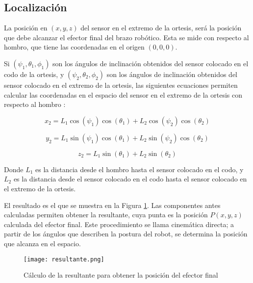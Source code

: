 \subsection{Localización}

La posición en $(x, y, z)$ del sensor en el extremo de la ortesis, será la posición que debe alcanzar el efector final del brazo robótico. Esta se mide con respecto al hombro, que tiene las coordenadas en el origen $(0, 0 ,0)$.

Si $(\psi_{1}, \theta_{1}, \phi_{1})$ son los ángulos de inclinación obtenidos del sensor colocado en el codo de la ortesis, y $(\psi_{2}, \theta_{2}, \phi_{2})$ son los ángulos de inclinación obtenidos del sensor colocado en el extremo de la ortesis, las siguientes ecuaciones permiten calcular las coordenadas en el espacio del sensor en el extremo de la ortesis con respecto al hombro \cite{mathworks2025}:

\begin{equation}
x_2 = L_1 \cos(\psi_1) \cos(\theta_1) + L_2 \cos(\psi_2) \cos(\theta_2)
\end{equation}

\begin{equation}
y_2 = L_1 \sin(\psi_1) \cos(\theta_1) + L_2 \sin(\psi_2) \cos(\theta_2)
\end{equation}

\begin{equation}
z_2 = L_1 \sin(\theta_1) + L_2 \sin(\theta_2)
\end{equation}

Donde $L_1$ es la distancia desde el hombro hasta el sensor colocado en el codo, y $L_2$ es la distancia desde el sensor colocado en el codo hasta el sensor colocado en el extremo de la ortesis.

El resultado es el que se muestra en la Figura \ref{fig:resultante}. Las componentes antes calculadas permiten obtener la resultante, cuya punta es la posición $P(x,y,z)$ calculada del efector final. Este procedimiento se llama cinemática directa; a partir de los ángulos que describen la postura del robot, se determina la posición que alcanza en el espacio.

\begin{figure}[htb]
	\centering
	\texttt{[image: resultante.png]}
	\caption{Cálculo de la resultante para obtener la posición del efector final}
	\label{fig:resultante}
\end{figure}